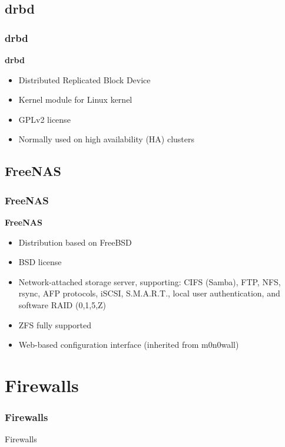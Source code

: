 \documentclass{beamer}
\begin{document}
  \subsection{drbd}
  \begin{frame}
    \frametitle{drbd}
    \textbf{drbd}
    \begin{itemize}
      \item Distributed Replicated Block Device
      \item Kernel module for Linux kernel
      \item GPLv2 license
      \item Normally used on high availability (HA) clusters
    \end{itemize}
  \end{frame}
  
  \subsection{FreeNAS}
  \begin{frame}
    \frametitle{FreeNAS}
    \textbf{FreeNAS}
    \begin{itemize}
      \item Distribution based on FreeBSD
      \item BSD license
      \item Network-attached storage server, supporting: CIFS (Samba), FTP, NFS, rsync, AFP protocols, iSCSI, S.M.A.R.T., local user authentication, and software RAID (0,1,5,Z)
      \item ZFS fully supported
      \item Web-based configuration interface (inherited from m0n0wall)
    \end{itemize}
  \end{frame}

  
\section{Firewalls}

\begin{frame}
  \frametitle{Firewalls}
  \begin{center}
    \Huge Firewalls
  \end{center}
\end{frame}
\end{document}
